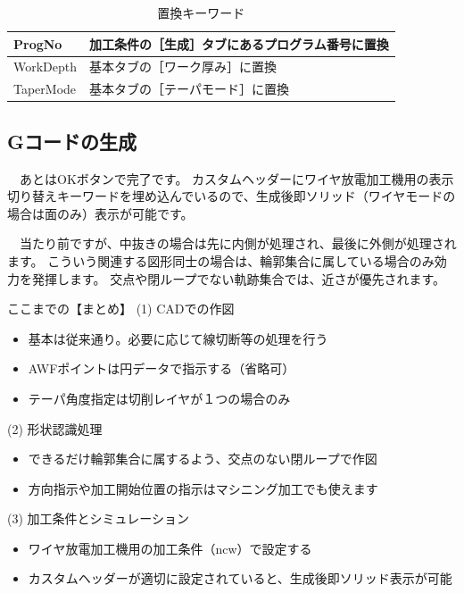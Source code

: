 \begin{table}[H]
\centering
\caption{置換キーワード}
\label{tab:keyword}
\begin{tabular}{|p{3cm}|p{10cm}|}
\hline
ProgNo & 加工条件の［生成］タブにあるプログラム番号に置換 \\ \hline
WorkDepth & 基本タブの［ワーク厚み］に置換 \\
TaperMode & 基本タブの［テーパモード］に置換 \\ \hline
\end{tabular}
\end{table}

\subsection{Gコードの生成}
　あとはOKボタンで完了です。
カスタムヘッダーにワイヤ放電加工機用の表示切り替えキーワードを埋め込んでいるので、生成後即ソリッド（ワイヤモードの場合は面のみ）表示が可能です。


　当たり前ですが、中抜きの場合は先に内側が処理され、最後に外側が処理されます。
こういう関連する図形同士の場合は、輪郭集合に属している場合のみ効力を発揮します。
交点や閉ループでない軌跡集合では、近さが優先されます。

\vspace*{3zh}
\begin{itembox}[l]{ここまでの【まとめ】}
(1) CADでの作図
\begin{itemize}
\item 基本は従来通り。必要に応じて線切断等の処理を行う
\item AWFポイントは円データで指示する（省略可）
\item テーパ角度指定は切削レイヤが１つの場合のみ
\end{itemize}
(2) 形状認識処理
\begin{itemize}
\item できるだけ輪郭集合に属するよう、交点のない閉ループで作図
\item 方向指示や加工開始位置の指示はマシニング加工でも使えます
\end{itemize}
(3) 加工条件とシミュレーション
\begin{itemize}
\item ワイヤ放電加工機用の加工条件（ncw）で設定する
\item カスタムヘッダーが適切に設定されていると、生成後即ソリッド表示が可能
\end{itemize}
\end{itembox}
